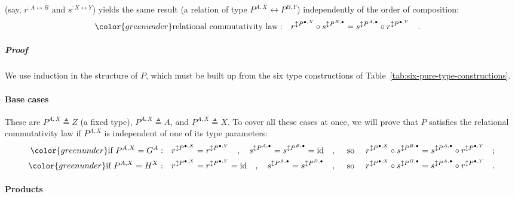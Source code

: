 \noindent (say, $r^{:A\leftrightarrow B}$ and $s^{:X\leftrightarrow Y}$)
yields the same result (a relation of type $P^{A,X}\leftrightarrow P^{B,Y}$)
independently of the order of composition:
\begin{align*}
{\color{greenunder}\text{relational commutativity law}:}\quad & r^{\updownarrow P^{\bullet,X}}\circ s^{\updownarrow P^{B,\bullet}}=s^{\updownarrow P^{A,\bullet}}\circ r^{\updownarrow P^{\bullet,Y}}\quad.
\end{align*}


\subparagraph{Proof}

We use induction in the structure of $P$, which must be built up
from the six type constructions of Table~\ref{tab:six-pure-type-constructions}. 

\paragraph{Base cases}

These are $P^{A,X}\triangleq Z$ (a fixed type), $P^{A,X}\triangleq A$,
and $P^{A,X}\triangleq X$. To cover all these cases at once, we will
prove that $P$ satisfies the relational commutativity law if $P^{A,X}$
is independent of one of its type parameters:
\begin{align*}
{\color{greenunder}\text{if }P^{A,X}=G^{A}:}\quad & r^{\updownarrow P^{\bullet,X}}=r^{\updownarrow P^{\bullet,Y}}\quad,\quad s^{\updownarrow P^{A,\bullet}}=s^{\updownarrow P^{B,\bullet}}=\text{id}\quad,\quad\text{ so }\quad r^{\updownarrow P^{\bullet,X}}\circ s^{\updownarrow P^{B,\bullet}}=s^{\updownarrow P^{A,\bullet}}\circ r^{\updownarrow P^{\bullet,Y}}\quad;\\
{\color{greenunder}\text{if }P^{A,X}=H^{X}:}\quad & r^{\updownarrow P^{\bullet,X}}=r^{\updownarrow P^{\bullet,Y}}=\text{id}\quad,\quad s^{\updownarrow P^{A,\bullet}}=s^{\updownarrow P^{B,\bullet}}\quad,\quad\text{ so }\quad r^{\updownarrow P^{\bullet,X}}\circ s^{\updownarrow P^{B,\bullet}}=s^{\updownarrow P^{A,\bullet}}\circ r^{\updownarrow P^{\bullet,Y}}\quad.
\end{align*}


\paragraph{Products}

